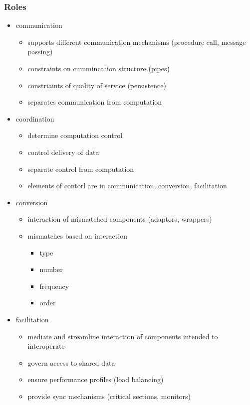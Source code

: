 \documentclass[]{article}
\theoremstyle{definition}
\begin{document}
	\subsubsection{Roles}
	\begin{itemize}
		\item communication
			\begin{itemize}
				\item supports different communication mechanisms (procedure call, message passing)
				\item constraints on cummincation structure (pipes)
				\item constriaints of quality of service (persistence)
				\item separates communication from computation
			\end{itemize}
		\item coordination
			\begin{itemize}
				\item determine computation control
				\item control delivery of data
				\item separate control from computation
				\item elements of contorl are in communication, conversion, facilitation
			\end{itemize}
		\item conversion
			\begin{itemize}
				\item interaction of mismatched components (adaptors, wrappers)
				\item mismatches based on interaction
					\begin{itemize}
						\item type
						\item number
						\item frequency
						\item order
					\end{itemize}
			\end{itemize}
		\item facilitation
			\begin{itemize}
				\item mediate and streamline interaction of components intended to interoperate
				\item govern access to shared data
				\item ensure performance profiles (load balancing)
				\item provide sync mechanisms (critical sections, monitors)
			\end{itemize}
	\end{itemize}
\end{document}
